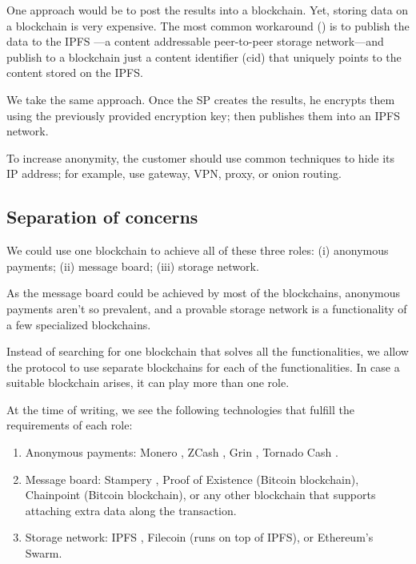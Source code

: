 \documentclass{ieeeaccess}
\begin{document}
One approach would be to post the results into a blockchain. Yet, storing data on a blockchain is very expensive. The most common workaround (\cite{shahid2020blockchain, wang2019auditable, chen2017improved, Usageide95}) is to publish the data to the IPFS \cite{benet2014ipfs}—a content addressable peer-to-peer storage network—and publish to a blockchain just a content identifier (cid) that uniquely points to the content stored on the IPFS.

We take the same approach. Once the SP creates the results, he encrypts them using the previously provided encryption key; then publishes them into an IPFS network.

To increase anonymity, the customer should use common techniques to hide its IP address; for example, use gateway, VPN, proxy, or onion routing.

\subsection{Separation of concerns}
We could use one blockchain to achieve all of these three roles: (i) anonymous payments; (ii) message board; (iii) storage network.

As the message board could be achieved by most of the blockchains, anonymous payments aren't so prevalent, and a provable storage network is a functionality of a few specialized blockchains.

Instead of searching for one blockchain that solves all the functionalities, we allow the protocol to use separate blockchains for each of the functionalities. In case a suitable blockchain arises, it can play more than one role.

At the time of writing, we see the following technologies that fulfill the requirements of each role:

\begin{enumerate}
\def\labelenumi{\arabic{enumi}.}

\item Anonymous payments: Monero \cite{van2013cryptonote}, ZCash
  \cite{sasson2014zerocash}, Grin \cite{fuchsbauer2019aggregate},
  Tornado Cash \cite{pertsev2019tornado}.
\item Message board: Stampery \cite{de2016stampery}, Proof of Existence
  \cite{proofofexistence} (Bitcoin blockchain), Chainpoint
  \cite{Chainpoi39} (Bitcoin blockchain), or any other blockchain that
  supports attaching extra data along the transaction.
\item Storage network: IPFS \cite{benet2014ipfs}, Filecoin
  \cite{benetfilecoin} (runs on top of IPFS), or Ethereum's
  Swarm\cite{swarmwhi49}.
\end{enumerate}
\end{document}

